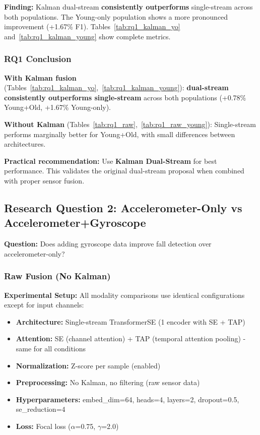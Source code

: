 \documentclass{article}
\begin{document}
\textbf{Finding:} Kalman dual-stream \textbf{consistently outperforms} single-stream across both populations. The Young-only population shows a more pronounced improvement (+1.67\% F1). Tables~\ref{tab:rq1_kalman_yo} and~\ref{tab:rq1_kalman_young} show complete metrics.

\subsubsection{RQ1 Conclusion}

\begin{tcolorbox}[colback=blue!5,colframe=blue!50!black,title=\textbf{Answer to RQ1: Single-Stream vs Dual-Stream}]
\textbf{With Kalman fusion} (Tables~\ref{tab:rq1_kalman_yo},~\ref{tab:rq1_kalman_young}): \textbf{dual-stream consistently outperforms single-stream} across both populations (+0.78\% Young+Old, +1.67\% Young-only).

\textbf{Without Kalman} (Tables~\ref{tab:rq1_raw},~\ref{tab:rq1_raw_young}): Single-stream performs marginally better for Young+Old, with small differences between architectures.

\textbf{Practical recommendation:} Use \textbf{Kalman Dual-Stream} for best performance. This validates the original dual-stream proposal when combined with proper sensor fusion.
\end{tcolorbox}

\subsection{Research Question 2: Accelerometer-Only vs Accelerometer+Gyroscope}

\textbf{Question:} Does adding gyroscope data improve fall detection over accelerometer-only?

\subsubsection{Raw Fusion (No Kalman)}

\textbf{Experimental Setup:} All modality comparisons use identical configurations except for input channels:
\begin{itemize}
    \item \textbf{Architecture:} Single-stream TransformerSE (1 encoder with SE + TAP)
    \item \textbf{Attention:} SE (channel attention) + TAP (temporal attention pooling) - same for all conditions
    \item \textbf{Normalization:} Z-score per sample (enabled)
    \item \textbf{Preprocessing:} No Kalman, no filtering (raw sensor data)
    \item \textbf{Hyperparameters:} embed\_dim=64, heads=4, layers=2, dropout=0.5, se\_reduction=4
    \item \textbf{Loss:} Focal loss ($\alpha$=0.75, $\gamma$=2.0)
\end{itemize}
\end{document}
